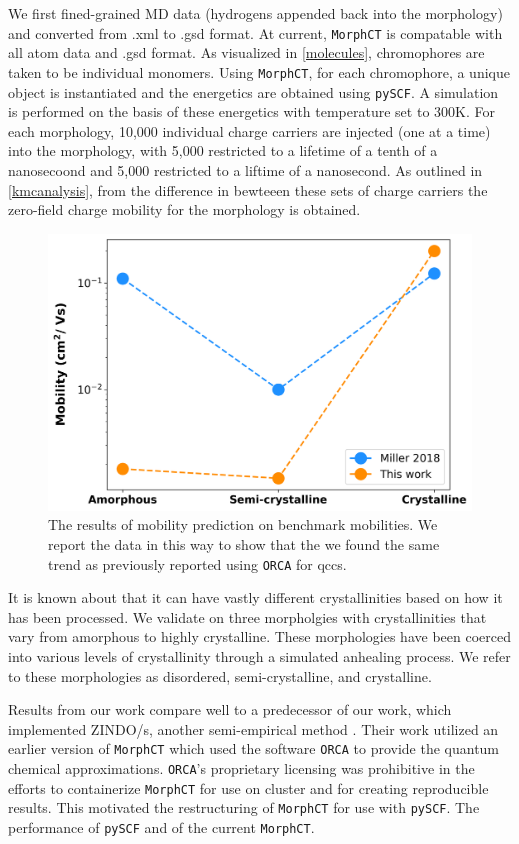 We first fined-grained MD data (hydrogens appended back into
the morphology) and converted from .xml to .gsd format. At current, \texttt{MorphCT} is compatable with all atom data
and .gsd format. As visualized in \autoref{molecules}, chromophores are taken to be individual monomers. 
Using \texttt{MorphCT}, for each chromophore, a unique object is instantiated and the energetics are obtained using
\texttt{pySCF}. A  simulation is performed on the basis of these energetics with  temperature set to 300K. For
each morphology, 10,000 individual charge carriers are injected (one at a time) into the morphology, with
5,000 restricted to a lifetime of a tenth of a nanosecoond and 5,000 restricted to a liftime of a nanosecond.
As outlined in \autoref{kmcanalysis}, from the difference in  bewteeen these sets of charge carriers the
zero-field charge mobility for the morphology is obtained. 

\begin{figure}
  \center
  \includegraphics[width = .6\textwidth]{figures/validation.png}
  \caption{The results of mobility prediction on benchmark  mobilities. We report the data in this way to
    show that the we found the same trend as previously reported using \texttt{ORCA} for \gls{qcc}s. }
  \label{mobility-validation}
\end{figure}

It is known about  that it can have vastly different crystallinities based on how it has been processed. 
We validate on three morpholgies with crystallinities that vary from amorphous to highly crystalline. These morphologies have been coerced into various levels of crystallinity through a simulated anhealing process. 
We refer to these morphologies as disordered, semi-crystalline, and crystalline.

Results from our work compare well to a predecessor of our work, which implemented ZINDO/s, another
semi-empirical  method \cite{Miller2018a}\cite{Jones2017}. 
Their work utilized an earlier version of \texttt{MorphCT} which used the  software 
\texttt{ORCA} \cite{Neese2012b} to provide the quantum chemical approximations. 
\texttt{ORCA}'s proprietary licensing was prohibitive in the efforts to containerize \texttt{MorphCT} for use on cluster and for
creating reproducible results. This motivated the restructuring of \texttt{MorphCT} for use with \texttt{pySCF}. The
performance of \texttt{pySCF} and of the current \texttt{MorphCT}.

